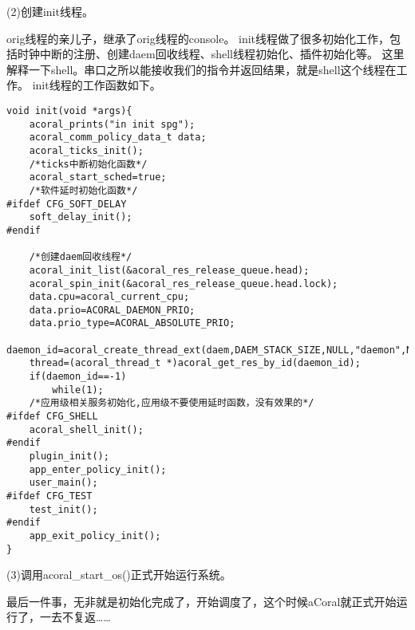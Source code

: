 (2)创建init线程。

orig线程的亲儿子，继承了orig线程的console。
init线程做了很多初始化工作，包括时钟中断的注册、创建daem回收线程、shell线程初始化、插件初始化等。
这里解释一下shell。串口之所以能接收我们的指令并返回结果，就是shell这个线程在工作。
init线程的工作函数如下。
\begin{lstlisting}
void init(void *args){
	acoral_prints("in init spg");
	acoral_comm_policy_data_t data;
	acoral_ticks_init();
	/*ticks中断初始化函数*/
	acoral_start_sched=true;
	/*软件延时初始化函数*/
#ifdef CFG_SOFT_DELAY
	soft_delay_init();
#endif

	/*创建daem回收线程*/
  	acoral_init_list(&acoral_res_release_queue.head);
  	acoral_spin_init(&acoral_res_release_queue.head.lock);
	data.cpu=acoral_current_cpu;
	data.prio=ACORAL_DAEMON_PRIO;
	data.prio_type=ACORAL_ABSOLUTE_PRIO;
	daemon_id=acoral_create_thread_ext(daem,DAEM_STACK_SIZE,NULL,"daemon",NULL,ACORAL_SCHED_POLICY_COMM,&data);
	thread=(acoral_thread_t *)acoral_get_res_by_id(daemon_id);
	if(daemon_id==-1)
		while(1);
	/*应用级相关服务初始化,应用级不要使用延时函数，没有效果的*/
#ifdef CFG_SHELL
	acoral_shell_init();
#endif
	plugin_init();
	app_enter_policy_init();
	user_main();
#ifdef CFG_TEST
	test_init();
#endif
	app_exit_policy_init();
}
\end{lstlisting}


(3)调用acoral\_start\_os()正式开始运行系统。

最后一件事，无非就是初始化完成了，开始调度了，这个时候aCoral就正式开始运行了，一去不复返……




